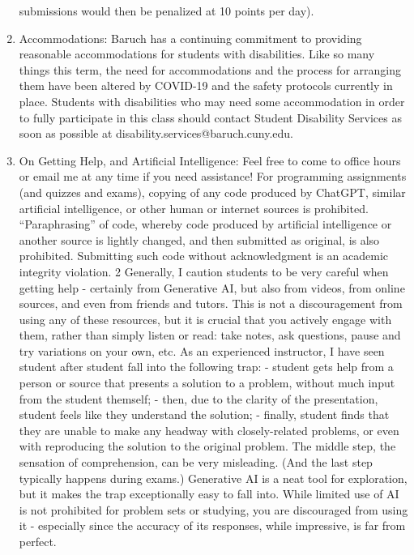 \documentclass[a4paper]{article}
\begin{document}
\begin{enumerate}
    submissions would then be penalized at 10 points per day).
    \item Accommodations: Baruch has a continuing commitment to providing reasonable
    accommodations for students with disabilities. Like so many things this term, the need for
    accommodations and the process for arranging them have been altered by COVID-19 and the
    safety protocols currently in place. Students with disabilities who may need some
    accommodation in order to fully participate in this class should contact Student Disability
    Services as soon as possible at disability.services@baruch.cuny.edu.
    \item On Getting Help, and Artificial Intelligence: Feel free to come to office hours or email me at any
    time if you need assistance!
    For programming assignments (and quizzes and exams), copying of any code produced by
    ChatGPT, similar artificial intelligence, or other human or internet sources is prohibited.
    “Paraphrasing” of code, whereby code produced by artificial intelligence or another source is
    lightly changed, and then submitted as original, is also prohibited. Submitting such code
    without acknowledgment is an academic integrity violation.
    2
    Generally, I caution students to be very careful when getting help - certainly from Generative
    AI, but also from videos, from online sources, and even from friends and tutors. This is not a
    discouragement from using any of these resources, but it is crucial that you actively engage with
    them, rather than simply listen or read: take notes, ask questions, pause and try variations on
    your own, etc. As an experienced instructor, I have seen student after student fall into the
    following trap:
    - student gets help from a person or source that presents a solution to a problem, without much
    input from the student themself;
    - then, due to the clarity of the presentation, student feels like they understand the solution;
    - finally, student finds that they are unable to make any headway with closely-related problems,
    or even with reproducing the solution to the original problem.
    The middle step, the sensation of comprehension, can be very misleading. (And the last step
    typically happens during exams.)
    Generative AI is a neat tool for exploration, but it makes the trap exceptionally easy to fall into.
    While limited use of AI is not prohibited for problem sets or studying, you are discouraged from
    using it - especially since the accuracy of its responses, while impressive, is far from perfect.

\end{enumerate}
\end{document}

